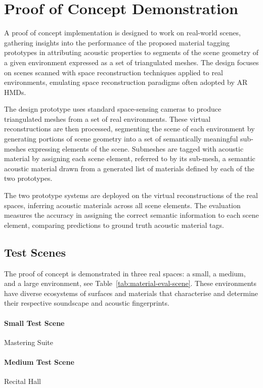 \section{Proof of Concept Demonstration}
A proof of concept implementation is designed to work on real-world scenes, gathering insights into the performance of the proposed material tagging prototypes in attributing acoustic properties to segments of the scene geometry of a given environment expressed as a set of triangulated meshes. The design focuses on scenes scanned with space reconstruction techniques applied to real environments, emulating space reconstruction paradigms often adopted by AR HMDs.\par
The design prototype uses standard space-sensing cameras to produce triangulated meshes from a set of real environments. These virtual reconstructions are then processed, segmenting the scene of each environment by generating portions of scene geometry into a set of semantically meaningful sub-meshes expressing elements of the scene. Submeshes are tagged with acoustic material by assigning each scene element, referred to by its sub-mesh, a semantic acoustic material drawn from a generated list of materials defined by each of the two prototypes.\par
The two prototype systems are deployed on the virtual reconstructions of the real spaces, inferring acoustic materials across all scene elements. The evaluation measures the accuracy in assigning the correct semantic information to each scene element, comparing predictions to ground truth acoustic material tags.

\subsection{Test Scenes}
The proof of concept is demonstrated in three real spaces: a small, a medium, and a large environment, see Table~\ref{tab:material-eval-scene}. These environments have diverse ecosystems of surfaces and materials that characterise and determine their respective soundscape and acoustic fingerprints.

\paragraph{Small Test Scene}
Mastering Suite

\paragraph{Medium Test Scene}
Recital Hall

